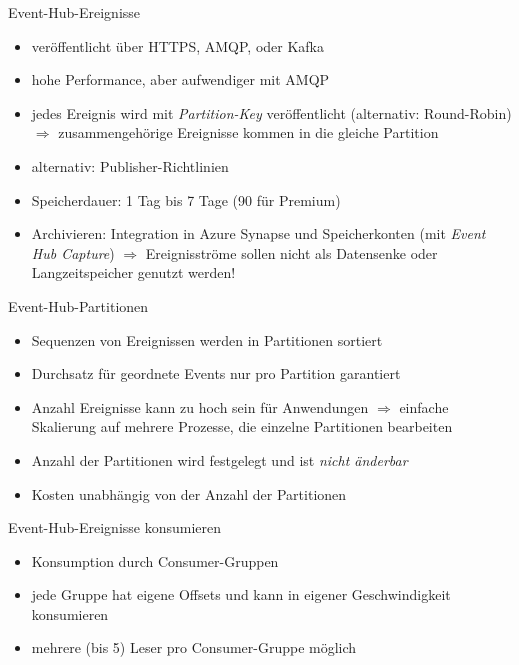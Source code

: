 \begin{flashcard}[]{Event-Hub-Ereignisse}
  \begin{itemize}
    \item veröffentlicht über HTTPS, AMQP, oder Kafka
    \item hohe Performance, aber aufwendiger mit AMQP
    \item jedes Ereignis wird mit \emph{Partition-Key} veröffentlicht (alternativ: Round-Robin)\newline
      $\Rightarrow$ zusammengehörige Ereignisse kommen in die gleiche Partition
    \item alternativ: Publisher-Richtlinien
    \item Speicherdauer: 1 Tag bis 7 Tage (90 für Premium)
    \item Archivieren: Integration in Azure Synapse und Speicherkonten (mit \emph{Event Hub Capture})\newline
      $\Rightarrow$ Ereignisströme sollen nicht als Datensenke oder Langzeitspeicher genutzt werden!
  \end{itemize}
\end{flashcard}

\begin{flashcard}[]{Event-Hub-Partitionen}
  \begin{itemize}
    \item Sequenzen von Ereignissen werden in Partitionen sortiert
    \item Durchsatz für geordnete Events nur pro Partition garantiert
    \item Anzahl Ereignisse kann zu hoch sein für Anwendungen\newline
      $\Rightarrow$ einfache Skalierung auf mehrere Prozesse, die einzelne Partitionen bearbeiten
    \item Anzahl der Partitionen wird festgelegt und ist \emph{nicht änderbar}
    \item Kosten unabhängig von der Anzahl der Partitionen
  \end{itemize}
\end{flashcard}

\begin{flashcard}[]{Event-Hub-Ereignisse konsumieren}
  \begin{itemize}
    \item Konsumption durch Consumer-Gruppen
    \item jede Gruppe hat eigene Offsets und kann in eigener Geschwindigkeit konsumieren
    \item mehrere (bis 5) Leser pro Consumer-Gruppe möglich
  \end{itemize}
\end{flashcard}



